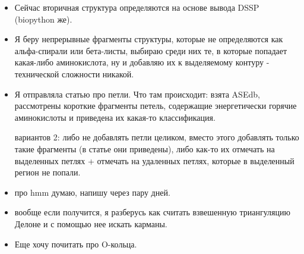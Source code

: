 \begin{itemize}
\item Сейчас вторичная структура определяются на основе вывода DSSP (biopython же).

\item Я беру непрерывные фрагменты структуры, которые не определяются как альфа-спирали или бета-листы, выбираю среди них те, в которые попадает какая-либо аминокислота, ну и добавляю их к выделяемому контуру - технической сложности никакой.

\end{itemize}


\begin{itemize}
\item Я отправляла статью про петли. Что там происходит: взята ASEdb, рассмотрены короткие фрагменты петель, содержащие энергетически горячие аминокислоты и приведена их какая-то классификация.

вариантов 2: либо не добавлять петли целиком, вместо этого добавлять только такие фрагменты (в статье они приведены), либо как-то их отмечать на выделенных петлях + отмечать на удаленных петлях, которые в выделенный регион не попали.

\item про hmm думаю, напишу через пару дней.

\item вообще если получится, я разберусь как считать взвешенную триангуляцию Делоне и с помощью нее искать карманы.

\item Еще хочу почитать про O-кольца.

\end{itemize}
